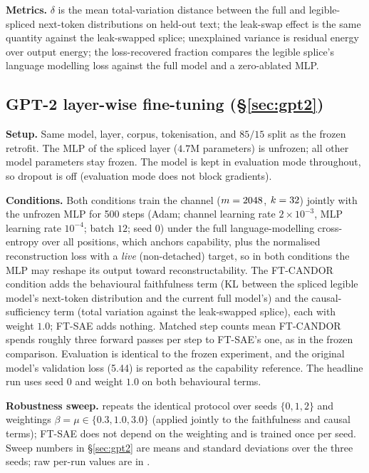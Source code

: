 \documentclass[11pt]{article}
\providecommand{\ftSteps}{500}\providecommand{\ftOrigLoss}{5.44}
\providecommand{\ftSweepWeightLow}{0.3}\providecommand{\ftSweepWeightMid}{1.0}
\providecommand{\ftSweepWeightHigh}{3.0}
\begin{document}
\textbf{Metrics.} $\delta$ is the mean total-variation distance between the full and
legible-spliced next-token distributions on held-out text; the leak-swap effect is the
same quantity against the leak-swapped splice; unexplained variance is residual energy
over output energy; the loss-recovered fraction compares the legible splice's language
modelling loss against the full model and a zero-ablated MLP.

\subsection{GPT-2 layer-wise fine-tuning (\S\ref{sec:gpt2})}
\textbf{Setup.} Same model, layer, corpus, tokenisation, and $85/15$ split as the
frozen retrofit. The MLP of the spliced layer ($4.7$M parameters) is unfrozen; all
other model parameters stay frozen. The model is kept in evaluation mode throughout, so
dropout is off (evaluation mode does not block gradients).

\textbf{Conditions.} Both conditions train the channel ($m=2048$, $k=32$)
jointly with the unfrozen MLP for \ftSteps{} steps (Adam; channel learning rate
$2\times10^{-3}$, MLP learning rate $10^{-4}$; batch $12$; seed $0$) under the full
language-modelling cross-entropy over all positions, which anchors capability, plus the
normalised reconstruction loss with a \emph{live} (non-detached) target, so in both
conditions the MLP may reshape its output toward reconstructability. The FT-CANDOR
condition adds the behavioural faithfulness term (KL between the spliced legible
model's next-token distribution and the current full model's) and the
causal-sufficiency term (total variation against the leak-swapped splice), each with
weight $1.0$; FT-SAE adds nothing. Matched step counts mean FT-CANDOR spends roughly
three forward passes per step to FT-SAE's one, as in the frozen comparison. Evaluation
is identical to the frozen experiment, and the original model's validation loss
(\ftOrigLoss{}) is reported as the capability reference. The headline run uses seed
$0$ and weight $1.0$ on both behavioural terms.

\textbf{Robustness sweep.}  repeats the
identical protocol over seeds $\{0, 1, 2\}$ and weightings
$\beta=\mu\in\{\ftSweepWeightLow, \ftSweepWeightMid, \ftSweepWeightHigh\}$ (applied
jointly to the faithfulness and causal terms); FT-SAE does not depend on the
weighting and is trained once per seed. Sweep numbers in \S\ref{sec:gpt2} are means
and standard deviations over the three seeds; raw per-run values are in
.
\end{document}

